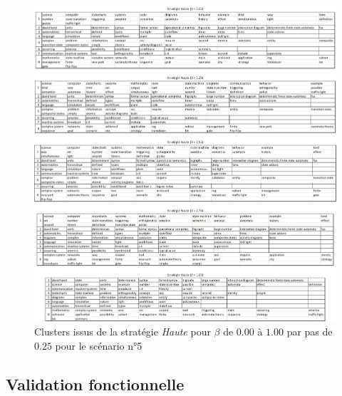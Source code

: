 \begin{figure}[htb!]
\centering
\centerline{  %
\includegraphics[scale=0.55]{4-Experiences/images/cas-6/clusters-Statecharts-S=H.png}
}
\caption{Clusters issus de la stratégie \textit{Haute} pour $ \beta $ de $0.00$ à $1.00$ par pas de $0.25$ pour le scénario n°5}
\label{figure:4-cas-6-PII-ClustersStrategieHaute}
\end{figure}





\clearpage %
\newpage   %


\subsection{Validation fonctionnelle}
\label{subsection:Evaluation:DeroulementExperimentations:ValidationFonctionnelle}

